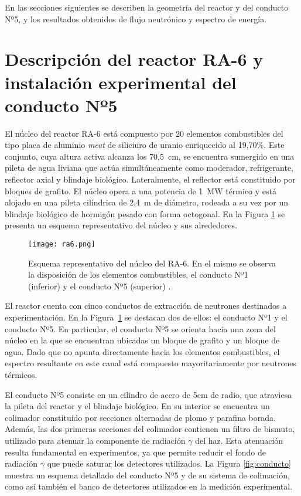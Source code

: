 En las secciones siguientes se describen la geometría del reactor y del conducto Nº5, y los resultados obtenidos de flujo neutrónico y espectro de energía.

\section{Descripción del reactor RA-6 y instalación experimental del conducto Nº5}

El núcleo del reactor RA-6 está compuesto por 20 elementos combustibles del tipo placa de aluminio \textit{meat} de siliciuro de uranio enriquecido al 19,70\%. Este conjunto, cuya altura activa alcanza los 70,5~cm, se encuentra sumergido en una pileta de agua liviana que actúa simultáneamente como moderador, refrigerante, reflector axial y blindaje biológico. Lateralmente, el reflector está constituido por bloques de grafito. El núcleo opera a una potencia de 1~MW térmico y está alojado en una pileta cilíndrica de 2,4~m de diámetro, rodeada a su vez por un blindaje biológico de hormigón pesado con forma octogonal. En la Figura \ref{fig:esquema-nucleo} se presenta un esquema representativo del núcleo y sus alrededores.

\begin{figure}[h]
\centering
\texttt{[image: ra6.png]}
\caption{Esquema representativo del núcleo del RA-6. En el mismo se observa la disposición de los elementos combustibles, el conducto Nº1 (inferior) y el conducto Nº5 (superior) \cite{DeptoNeutronesCAB2025}.}
\label{fig:esquema-nucleo}
\end{figure}

El reactor cuenta con cinco conductos de extracción de neutrones destinados a experimentación. En la Figura~\ref{fig:esquema-nucleo} se destacan dos de ellos: el conducto Nº1 y el conducto Nº5. En particular, el conducto Nº5 se orienta hacia una zona del núcleo en la que se encuentran ubicadas un bloque de grafito y un bloque de agua. Dado que no apunta directamente hacia los elementos combustibles, el espectro resultante en este canal está compuesto mayoritariamente por neutrones térmicos.

El conducto Nº5 consiste en un cilindro de acero de 5cm de radio, que atraviesa la pileta del reactor y el blindaje biológico. En su interior se encuentra un colimador constituido por secciones alternadas de plomo y parafina borada. Además, las dos primeras secciones del colimador contienen un filtro de bismuto, utilizado para atenuar la componente de radiación $\gamma$ del haz. Esta atenuación resulta fundamental en experimentos, ya que permite reducir el fondo de radiación $\gamma$ que puede saturar los detectores utilizados. La Figura \ref{fig:conducto} muestra un esquema detallado del conducto Nº5 y de su sistema de colimación, como así también el banco de detectores utilizados en la medición experimental.


